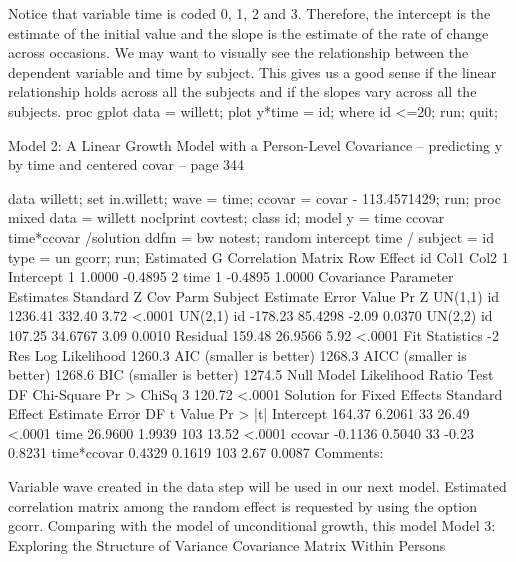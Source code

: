 Notice that variable time is coded 0, 1, 2 and 3. Therefore, the intercept is the estimate of the initial value and the slope is the estimate of the rate of change across occasions.
We may want to visually see the relationship between the dependent variable and time by subject. This gives us a good sense if the linear relationship holds across all the subjects and if the slopes vary across all the subjects.
proc gplot data = willett; 
  plot y*time = id;
  where id <=20;
run;
quit;
 

Model 2: A Linear Growth Model with a Person-Level Covariance -- predicting y by time and centered covar -- page 344

data willett;
  set in.willett;
  wave = time;
  ccovar = covar -  113.4571429;
run;
proc mixed data = willett noclprint covtest;
  class id;
  model y = time ccovar time*ccovar /solution ddfm = bw notest;
  random intercept time / subject = id type = un gcorr;
run;
         Estimated G Correlation Matrix
 Row    Effect       id        Col1        Col2
   1    Intercept     1      1.0000     -0.4895
   2    time          1     -0.4895      1.0000
                  Covariance Parameter Estimates
                                    Standard         Z
Cov Parm     Subject    Estimate       Error     Value        Pr Z
UN(1,1)      id          1236.41      332.40      3.72      <.0001
UN(2,1)      id          -178.23     85.4298     -2.09      0.0370
UN(2,2)      id           107.25     34.6767      3.09      0.0010
Residual                  159.48     26.9566      5.92      <.0001
           Fit Statistics
-2 Res Log Likelihood          1260.3
AIC (smaller is better)        1268.3
AICC (smaller is better)       1268.6
BIC (smaller is better)        1274.5
  Null Model Likelihood Ratio Test
    DF    Chi-Square      Pr > ChiSq
     3        120.72          <.0001
                    Solution for Fixed Effects
                           Standard
Effect         Estimate       Error      DF    t Value    Pr > |t|
Intercept        164.37      6.2061      33      26.49      <.0001
time            26.9600      1.9939     103      13.52      <.0001
ccovar          -0.1136      0.5040      33      -0.23      0.8231
time*ccovar      0.4329      0.1619     103       2.67      0.0087
Comments:

Variable wave created in the data step will be used in our next model.
Estimated correlation matrix among the random effect is requested by using the option gcorr.
Comparing with the model of unconditional growth, this model
Model 3: Exploring the Structure of Variance Covariance Matrix Within Persons

